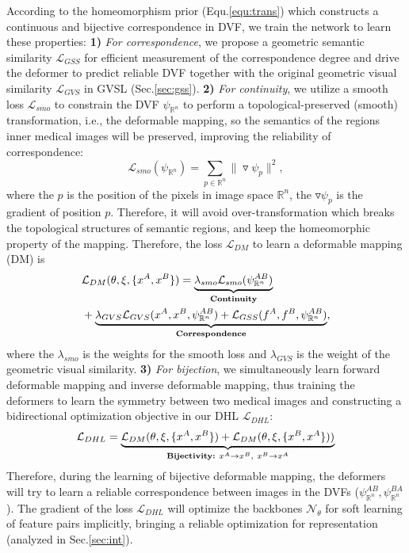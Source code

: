According to the homeomorphism prior (Equ.\ref{equ:trans}) which constructs a continuous and bijective correspondence in DVF, we train the network to learn these properties: \textbf{1)} \emph{For correspondence}, we propose a geometric semantic similarity $\mathcal{L}_{GSS}$ for efficient measurement of the correspondence degree and drive the deformer to predict reliable DVF together with the original geometric visual similarity $\mathcal{L}_{GVS}$ in GVSL \cite{He_2023_CVPR} (Sec.\ref{sec:gss}). \textbf{2)} \emph{For continuity}, we utilize a smooth loss $\mathcal{L}_{smo}$ to constrain the DVF $\psi_{\mathbb{R}^{n}}$ to perform a topological-preserved (smooth) transformation, i.e., the deformable mapping, so the semantics of the regions inner medical images will be preserved, improving the reliability of correspondence:
\begin{equation}\label{equ:smo}
   \mathcal{L}_{smo}(\psi_{\mathbb{R}^{n}})=\sum_{p\in\mathbb{R}^{n}}\|\triangledown\psi_{p}\|^{2},
\end{equation}
where the $p$ is the position of the pixels in image space $\mathbb{R}^{n}$, the $\triangledown\psi_{p}$ is the gradient of position $p$. Therefore, it will avoid over-transformation which breaks the topological structures of semantic regions, and keep the homeomorphic property of the mapping. Therefore, the loss $\mathcal{L}_{DM}$ to learn a deformable mapping (DM) is
\begin{align}\label{equ:DHLloss}
&\mathcal{L}_{DM}(\theta,\xi,\{x^{A},x^{B}\})=\underbrace{\lambda_{smo}\mathcal{L}_{smo}(\psi^{AB}_{\mathbb{R}^{n}})}_{\textbf{\text{Continuity}}}\\
&+\underbrace{\lambda_{GVS}\mathcal{L}_{GVS}(x^{A},x^{B},\psi^{AB}_{\mathbb{R}^{n}})+\mathcal{L}_{GSS}(f^{A},f^{B},\psi^{AB}_{\mathbb{R}^{n}})}_{\textbf{\text{Correspondence}}},\notag
\end{align}
where the $\lambda_{smo}$ is the weights for the smooth loss and $\lambda_{GVS}$ is the weight of the geometric visual similarity. \textbf{3)} \emph{For bijection}, we simultaneously learn forward deformable mapping and inverse deformable mapping, thus training the deformers to learn the symmetry between two medical images and constructing a bidirectional optimization objective in our DHL $\mathcal{L}_{DHL}$:
\begin{equation}\label{equ:DHLloss2}
\mathcal{L}_{DHL}=\underbrace{\mathcal{L}_{DM}(\theta,\xi,\{x^{A},x^{B}\})+\mathcal{L}_{DM}(\theta,\xi,\{x^{B},x^{A}\}))}_{\textbf{\text{Bijectivity:}}\ x^A\rightarrow x^B,\ x^B\rightarrow x^A}
\end{equation}
Therefore, during the learning of bijective deformable mapping, the deformers will try to learn a reliable correspondence between images in the DVFs ($\psi^{AB}_{\mathbb{R}^{n}},\psi^{BA}_{\mathbb{R}^{n}}$). The gradient of the loss $\mathcal{L}_{DHL}$ will optimize the backbones $\mathcal{N}_{\theta}$ for soft learning of feature pairs implicitly, bringing a reliable optimization for representation (analyzed in Sec.\ref{sec:int}).

